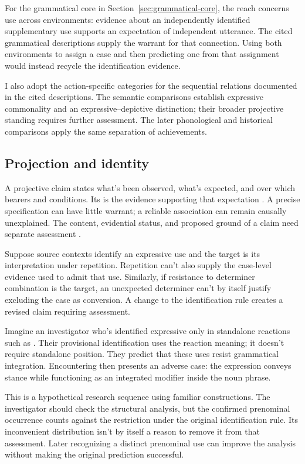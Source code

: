 \documentclass[12pt]{article}
\begin{document}
For the grammatical core in Section~\ref{sec:grammatical-core}, the reach
concerns use across environments: evidence about an independently identified
supplementary use supports an expectation of independent utterance.
The cited grammatical descriptions supply the warrant for that connection.
Using both environments to assign a case and then predicting one
from that assignment would instead recycle the identification evidence.

I also adopt the action-specific categories for the sequential relations
documented in the cited descriptions. The semantic comparisons establish
expressive commonality and an expressive--depictive distinction; their broader
projective standing requires further assessment. The later phonological
and historical comparisons apply the same separation of achievements.

\subsection{Projection and identity}

A projective claim states what's been observed, what's expected, and
over which bearers and conditions. Its  is the evidence
supporting that expectation \citep{Goodman1955}. A precise specification
can have little warrant; a reliable association can remain causally
unexplained. The content, evidential status, and proposed ground of a
claim need separate assessment
\citep[11--12]{reynolds2026projectibilityHistory}.

Suppose source contexts identify an expressive use and the target is
its interpretation under repetition. Repetition can't also supply the
case-level evidence used to admit that use. Similarly, if resistance
to determiner combination is the target, an unexpected determiner
can't by itself justify excluding the case as conversion. A change
to the identification rule creates a revised claim requiring assessment.

Imagine an investigator who's identified expressive 
only in standalone reactions such as . Their provisional identification uses the reaction meaning;
it doesn't require standalone position. They predict that these uses
resist grammatical integration. Encountering  then presents an adverse case: the expression conveys stance
while functioning as an integrated modifier inside the noun phrase.

This is a hypothetical research sequence using familiar constructions.
The investigator should check the structural analysis, but the confirmed
prenominal occurrence counts against the restriction under the original
identification rule. Its inconvenient distribution isn't by itself a
reason to remove it from that assessment. Later recognizing a distinct
prenominal use can improve the analysis without making the original
prediction successful.
\end{document}
